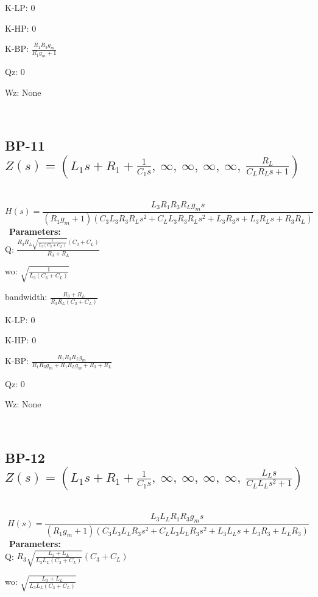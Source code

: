 \documentclass{article}
\begin{document}
K-LP: $0$\ 

K-HP: $0$\ 

K-BP: $\frac{R_{1} R_{3} g_{m}}{R_{1} g_{m} + 1}$\ 

Qz: $0$\ 

Wz: $\text{None}$\ 

\ 

\subsection{BP-11 $Z(s) = \left( L_{1} s + R_{1} + \frac{1}{C_{1} s}, \  \infty, \  \infty, \  \infty, \  \infty, \  \frac{R_{L}}{C_{L} R_{L} s + 1}\right)$ } \ 
\textbf{\[H(s) = \frac{L_{3} R_{1} R_{3} R_{L} g_{m} s}{\left(R_{1} g_{m} + 1\right) \left(C_{3} L_{3} R_{3} R_{L} s^{2} + C_{L} L_{3} R_{3} R_{L} s^{2} + L_{3} R_{3} s + L_{3} R_{L} s + R_{3} R_{L}\right)}\] } \ 
\textbf{Parameters:}\\ 

Q: $\frac{R_{3} R_{L} \sqrt{\frac{1}{L_{3} \left(C_{3} + C_{L}\right)}} \left(C_{3} + C_{L}\right)}{R_{3} + R_{L}}$\ 

wo: $\sqrt{\frac{1}{L_{3} \left(C_{3} + C_{L}\right)}}$\ 

bandwidth: $\frac{R_{3} + R_{L}}{R_{3} R_{L} \left(C_{3} + C_{L}\right)}$\ 

K-LP: $0$\ 

K-HP: $0$\ 

K-BP: $\frac{R_{1} R_{3} R_{L} g_{m}}{R_{1} R_{3} g_{m} + R_{1} R_{L} g_{m} + R_{3} + R_{L}}$\ 

Qz: $0$\ 

Wz: $\text{None}$\ 

\ 

\subsection{BP-12 $Z(s) = \left( L_{1} s + R_{1} + \frac{1}{C_{1} s}, \  \infty, \  \infty, \  \infty, \  \infty, \  \frac{L_{L} s}{C_{L} L_{L} s^{2} + 1}\right)$ } \ 
\textbf{\[H(s) = \frac{L_{3} L_{L} R_{1} R_{3} g_{m} s}{\left(R_{1} g_{m} + 1\right) \left(C_{3} L_{3} L_{L} R_{3} s^{2} + C_{L} L_{3} L_{L} R_{3} s^{2} + L_{3} L_{L} s + L_{3} R_{3} + L_{L} R_{3}\right)}\] } \ 
\textbf{Parameters:}\\ 

Q: $R_{3} \sqrt{\frac{L_{3} + L_{L}}{L_{3} L_{L} \left(C_{3} + C_{L}\right)}} \left(C_{3} + C_{L}\right)$\ 

wo: $\sqrt{\frac{L_{3} + L_{L}}{L_{3} L_{L} \left(C_{3} + C_{L}\right)}}$\ 
\end{document}
